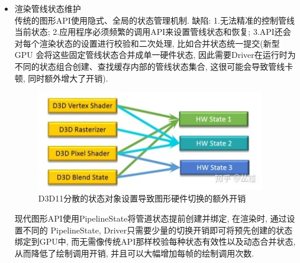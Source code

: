 \documentclass[UTF8]{ctexart}
\begin{document}
\begin{itemize}
\item 渲染管线状态维护
  \\传统的图形API使用隐式、全局的状态管理机制. 缺陷: 1.无法精准的控制管线当前状态; 2.应用程序必须频繁的调用API来设置管线状态和恢复; 3.API还会对每个渲染状态的设置进行校验和二次处理, 比如合并状态统一提交(新型 GPU 会将这些固定管线状态合并成单一硬件状态, 因此需要Driver在运行时为不同的状态组合创建、查找缓存内部的管线状态集合, 这很可能会导致管线卡顿, 同时额外增大了开销).
  \begin{figure}[H]
    \includegraphics[width=10cm]{render_state_merge.jpg}
    \centering
    \caption{D3D11分散的状态对象设置导致图形硬件切换的额外开销}
    \label{fig:gpu_rendering_pipline_state_merge}
  \end{figure}

  现代图形API使用PipelineState将管道状态提前创建并绑定, 在渲染时, 通过设置不同的 PipelineState, Driver只需要少量的切换开销即可将预先创建的状态绑定到GPU中, 而无需像传统API那样校验每种状态有效性以及动态合并状态, 从而降低了绘制调用开销, 并且可以大幅增加每帧的绘制调用次数.


\end{itemize}
\end{document}
